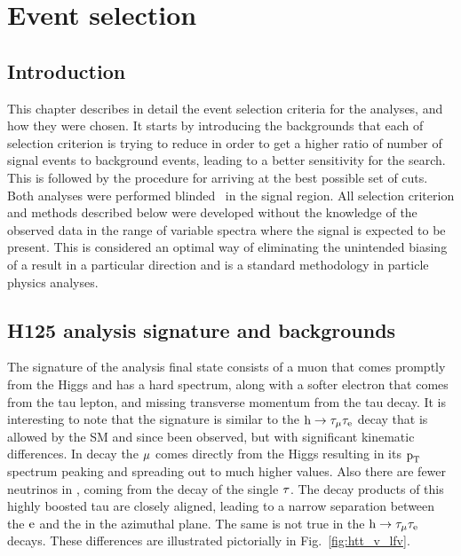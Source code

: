 \chapter{Event selection}
\label{evt_sel}
\section{Introduction}
\label{evt_sel_intro}
This chapter describes in detail the event selection criteria for the analyses, and how they were chosen. It starts by introducing the backgrounds that each of selection criterion is trying to reduce in order to get a higher ratio of number of signal events to background events, leading to a better sensitivity for the search. This is followed by the procedure for arriving at the best possible set of cuts. Both analyses were performed blinded~\cite{blind_analysis} in the signal region. All selection criterion and methods described below were developed without the knowledge of the observed data in the range of variable spectra where the signal is expected to be present. This is considered an optimal way of eliminating the unintended biasing of a result in a particular direction and is a standard methodology in particle physics analyses.  

\section{H125 analysis signature and backgrounds}
\label{h125_evt_selec}
The signature of the \hmue analysis final state consists of a muon that comes promptly from the Higgs and has a hard \pt spectrum, along with a softer electron that comes from the tau lepton, and missing transverse momentum from the tau decay. It is interesting to note that the signature is similar to the $\text{h} \to \tau_{\mu}\tau_{\text{e}}$ decay that is allowed by the SM and since been observed, but with significant kinematic differences. In \hmue decay the $\mu$ comes directly from the Higgs resulting in its $\text{p}_\text{T}$ spectrum peaking and spreading out to much higher values. Also there are fewer neutrinos in \hmue, coming from the decay of the single $\tau$. The decay products of this highly boosted tau are closely aligned, leading to a narrow separation between the $\text{e}$ and the \ptvecmiss in the azimuthal plane. The same is not true in the $\text{h} \to \tau_{\mu}\tau_{\text{e}}$ decays. These differences are illustrated pictorially in Fig.~\ref{fig:htt_v_lfv}.






